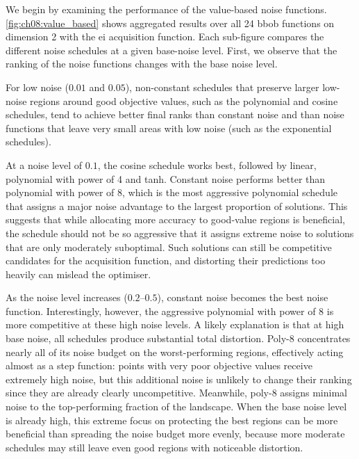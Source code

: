 We begin by examining the performance of the value-based noise functions.
\cref{fig:ch08:value_based} shows aggregated results over all 24 \gls{bbob} functions on dimension 2 with the \gls{ei} acquisition function. Each sub-figure compares the different noise schedules at a given base-noise level. First, we observe that the ranking of the noise functions changes with the base noise level.

For low noise ($0.01$ and $0.05$), non-constant schedules that preserve larger low-noise regions around good objective values, such as the polynomial and cosine schedules, tend to achieve better final ranks than constant noise and than noise functions that leave very small areas with low noise (such as the exponential schedules).

At a noise level of $0.1$, the cosine schedule works best, followed by linear, polynomial with power of 4 and tanh. Constant noise performs better than polynomial with power of 8, which is the most aggressive polynomial schedule that assigns a major noise advantage to the largest proportion of solutions. This suggests that while allocating more accuracy to good-value regions is beneficial, the schedule should not be so aggressive that it assigns extreme noise to solutions that are only moderately suboptimal. Such solutions can still be competitive candidates for the acquisition function, and distorting their predictions too heavily can mislead the optimiser.

As the noise level increases ($0.2$--$0.5$), constant noise becomes the best noise function. Interestingly, however, the aggressive polynomial with power of 8 is more competitive at these high noise levels. A likely explanation is that at high base noise, all schedules produce substantial total distortion. Poly-8 concentrates nearly all of its noise budget on the worst-performing regions, effectively acting almost as a step function: points with very poor objective values receive extremely high noise, but this additional noise is unlikely to change their ranking since they are already clearly uncompetitive. Meanwhile, poly-8 assigns minimal noise to the top-performing fraction of the landscape. When the base noise level is already high, this extreme focus on protecting the best regions can be more beneficial than spreading the noise budget more evenly, because more moderate schedules may still leave even good regions with noticeable distortion.

